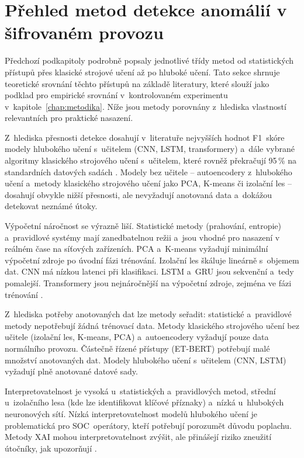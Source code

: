 \section{Přehled metod detekce anomálií v šifrovaném provozu}
\label{sec:prehled-srovnani}

Předchozí podkapitoly podrobně popsaly jednotlivé třídy metod od statistických přístupů přes klasické strojové učení až po hluboké učení. Tato sekce shrnuje teoretické srovnání těchto přístupů na základě literatury, které slouží jako podklad pro empirické srovnání v~kontrolovaném experimentu v~kapitole~\ref{chap:metodika}. Níže jsou metody porovnány z~hlediska vlastností relevantních pro praktické nasazení.

Z~hlediska přesnosti detekce dosahují v~literatuře nejvyšších hodnot F1~skóre modely hlubokého učení s~učitelem (CNN, LSTM, transformery) a~dále vybrané algoritmy klasického strojového učení s~učitelem, které rovněž překračují 95\,\% na standardních datových sadách \parencite{Barut2020}. Modely bez učitele -- autoencodery z~hlubokého učení a~metody klasického strojového učení jako PCA, K-means či izolační les -- dosahují obvykle nižší přesnosti, ale nevyžadují anotovaná data a~dokážou detekovat neznámé útoky.

Výpočetní náročnost se výrazně liší. Statistické metody (prahování, entropie) a~pravidlové systémy mají zanedbatelnou režii a~jsou vhodné pro nasazení v reálném čase na síťových zařízeních. PCA a~K-means vyžadují minimální výpočetní zdroje po úvodní fázi trénování. Izolační les škáluje lineárně s~objemem dat. CNN má nízkou latenci při klasifikaci. LSTM a~GRU jsou sekvenční a~tedy pomalejší. Transformery jsou nejnáročnější na výpočetní zdroje, zejména ve fázi trénování \parencite{Bakhshi2021}.

Z~hlediska potřeby anotovaných dat lze metody seřadit: statistické a~pravidlové metody nepotřebují žádná trénovací data. Metody klasického strojového učení bez učitele (izolační les, K-means, PCA) a~autoencodery vyžadují pouze data normálního provozu. Částečně řízené přístupy (ET-BERT) potřebují malé množství anotovaných dat. Modely hlubokého učení s~učitelem (CNN, LSTM) vyžadují plně anotované datové sady.

Interpretovatelnost je vysoká u~statistických a~pravidlových metod, střední u~izolačního lesa (kde lze identifikovat klíčové příznaky) a~nízká u~hlubokých neuronových sítí. Nízká interpretovatelnost modelů hlubokého učení je problematická pro SOC~operátory, kteří potřebují porozumět důvodu poplachu. Metody XAI mohou interpretovatelnost zvýšit, ale přinášejí riziko zneužití útočníky, jak upozorňují \textcite{Capuano2022}.

